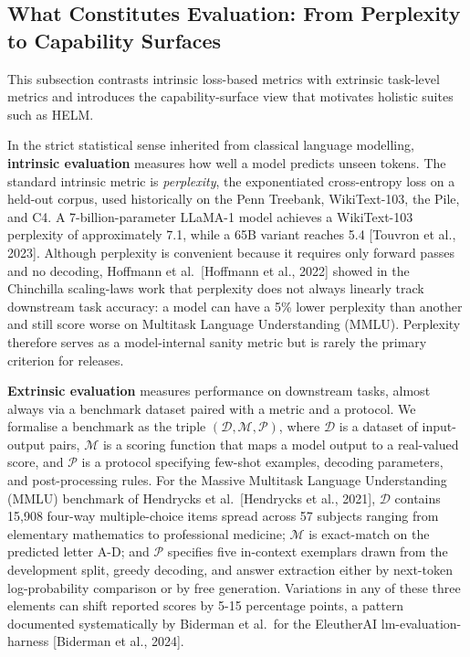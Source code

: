 \subsection{What Constitutes Evaluation: From Perplexity to Capability Surfaces}\label{what-constitutes-evaluation-from-perplexity-to-capability-surfaces}

This subsection contrasts intrinsic loss-based metrics with extrinsic task-level metrics and introduces the capability-surface view that motivates holistic suites such as HELM.

In the strict statistical sense inherited from classical language modelling, \textbf{intrinsic evaluation} measures how well a model predicts unseen tokens. The standard intrinsic metric is \emph{perplexity}, the exponentiated cross-entropy loss on a held-out corpus, used historically on the Penn Treebank, WikiText-103, the Pile, and C4. A 7-billion-parameter LLaMA-1 model achieves a WikiText-103 perplexity of approximately 7.1, while a 65B variant reaches 5.4 {[}Touvron et al., 2023{]}. Although perplexity is convenient because it requires only forward passes and no decoding, Hoffmann et al.~{[}Hoffmann et al., 2022{]} showed in the Chinchilla scaling-laws work that perplexity does not always linearly track downstream task accuracy: a model can have a 5\% lower perplexity than another and still score worse on Multitask Language Understanding (MMLU). Perplexity therefore serves as a model-internal sanity metric but is rarely the primary criterion for releases.

\textbf{Extrinsic evaluation} measures performance on downstream tasks, almost always via a benchmark dataset paired with a metric and a protocol. We formalise a benchmark as the triple \((\mathcal{D}, \mathcal{M}, \mathcal{P})\), where \(\mathcal{D}\) is a dataset of input-output pairs, \(\mathcal{M}\) is a scoring function that maps a model output to a real-valued score, and \(\mathcal{P}\) is a protocol specifying few-shot examples, decoding parameters, and post-processing rules. For the Massive Multitask Language Understanding (MMLU) benchmark of Hendrycks et al.~{[}Hendrycks et al., 2021{]}, \(\mathcal{D}\) contains 15,908 four-way multiple-choice items spread across 57 subjects ranging from elementary mathematics to professional medicine; \(\mathcal{M}\) is exact-match on the predicted letter A-D; and \(\mathcal{P}\) specifies five in-context exemplars drawn from the development split, greedy decoding, and answer extraction either by next-token log-probability comparison or by free generation. Variations in any of these three elements can shift reported scores by 5-15 percentage points, a pattern documented systematically by Biderman et al.~for the EleutherAI lm-evaluation-harness {[}Biderman et al., 2024{]}.

